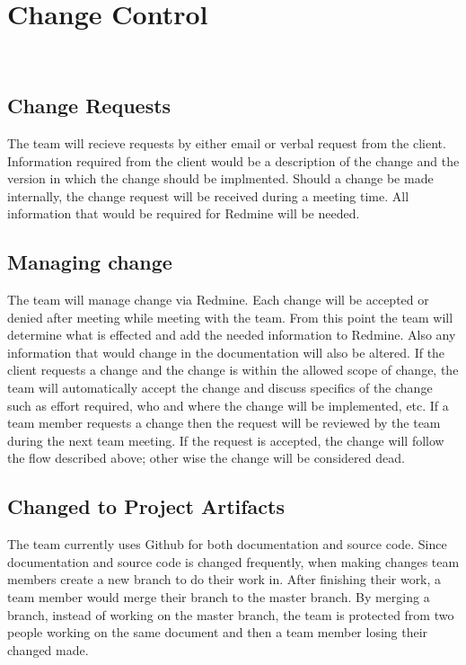 \section{Change Control}\\
\subsection{Change Requests}
The team will recieve requests by either email or verbal request from the client.  Information required from the client would be a description of the change and the version in which the change should be implmented.  Should a change be made internally, the change request will be received during a meeting time.  All information that would be required for Redmine will be needed.

\subsection{Managing change}
The team will manage change via Redmine.  Each change will be accepted or denied after meeting while meeting with the team.  From this point the team will determine what is effected and add the needed information to Redmine.  Also any information that would change in the documentation will also be altered.  If the client requests a change and the change is within the allowed scope of change, the team will automatically accept the change and discuss specifics of the change such as effort required, who and where the change will be implemented, etc. If a team member requests a change then the request will be reviewed by the team during the next team meeting.  If the request is accepted, the change will follow the flow described above; other wise the change will be considered dead.

\subsection{Changed to Project Artifacts}
The team currently uses Github for both documentation and source code.  Since documentation and source code is changed frequently, when making changes team members create a new branch to do their work in.  After finishing their work, a team member would merge their branch to the master branch.  By merging a branch, instead of working on the master branch, the team is protected from two people working on the same document and then a team member losing their changed made.